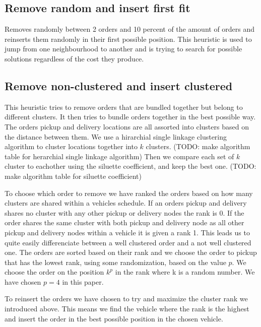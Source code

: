 \documentclass[../main.tex]{subfiles}
\begin{document}
\subsection{Remove random and insert first fit}
\label{sec:rand}
Removes randomly between 2 orders and 10 percent of the amount of orders and reinserts them randomly in their first possible position. 
This heuristic is used to jump from one neighbourhood to another and is trying to search for possible solutions regardless of the cost they produce.

\subsection{Remove non-clustered and insert clustered}
\label{sec:clust}
This heuristic tries to remove orders that are bundled together but belong to different clusters. It then tries to bundle orders together in the best possible way.
The orders pickup and delivery locations are all assorted into clusters based on the distance between them. 
We use a hirarchial single linkage clustering algorithm to cluster locations together into $k$ clusters. (TODO: make algorithm table for herarchial single linkage algorithm) 
Then we compare each set of $k$ cluster to eachother using the siluette coefficient, and keep the best one. (TODO: make algorithm table for siluette coefficient) \newlinw \par
To choose which order to remove we have ranked the orders based on how many clusters are shared within a vehicles schedule.
If an orders pickup and delivery shares no cluster with any other pickup or delivery nodes the rank is 0. 
If the order shares the same cluster with both pickup and delivery node as all other pickup and delivery nodes within a vehicle it is given a rank 1.  
This leads us to quite easily differenciate between a well clustered order and a not well clustered one.
The orders are sorted based on their rank and we choose the order to pickup that has the lowest rank, using some randomization, based on the value $p$. 
We choose the order on the position $k^p$ in the rank where k is a random number. 
We have chosen $p=4$ in this paper.  \newline \par
To reinsert the orders we have chosen to try and maximize the cluster rank we introduced above. This means we find the vehicle where the rank is the highest and insert the order in the best possible position in the chosen vehicle. 
\end{document}
